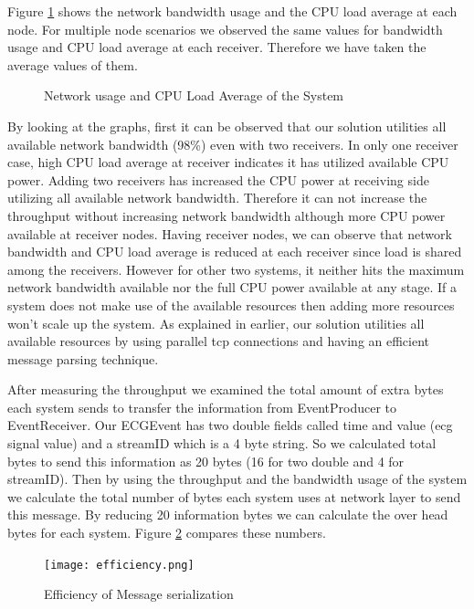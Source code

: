 Figure \ref{networkandload} shows the network bandwidth usage and the CPU load average at each node. For multiple node scenarios we observed the same values for bandwidth usage and CPU load average at each receiver. Therefore we have taken the average values of them. 

\begin{figure}[!t]
	\centering
	\hfil
	\caption{Network usage and CPU Load Average of the System}
	\label{networkandload}
\end{figure}
 

By looking at the graphs, first it can be observed that our solution utilities all available network bandwidth (98\%) even with two receivers. In only one receiver case, high CPU load average at receiver indicates it has utilized available CPU power. Adding two receivers has increased the CPU power at receiving side utilizing all available network bandwidth. Therefore it can not increase the throughput without increasing network bandwidth although more CPU power available at receiver nodes. Having receiver nodes, we can observe that network bandwidth and CPU load average is reduced at each receiver since load is shared among the receivers. However for other two systems, it neither hits the maximum network bandwidth available nor the full CPU power available at any stage. If a system does not make use of the available resources then adding more resources won't scale up the system. As explained in earlier, our solution utilities all available resources by using parallel tcp connections and having an efficient message parsing technique.

After measuring the throughput we examined the  total amount of extra bytes each system sends to transfer the information from EventProducer to EventReceiver. Our ECGEvent has two double fields called time and value (ecg signal value) and a streamID which is a 4 byte string. So we calculated total bytes to send this information as 20 bytes (16 for two double and 4 for streamID). Then by using the throughput and the bandwidth usage of the system we calculate the total number of bytes each system uses at network layer to send this message. By reducing 20 information bytes we can calculate the over head bytes for each system. Figure \ref{efficiency} compares these numbers.

\begin{figure}[!t]
        \centering
        \texttt{[image: efficiency.png]}

        \caption{Efficiency of Message serialization}
        \label{efficiency}
\end{figure}

